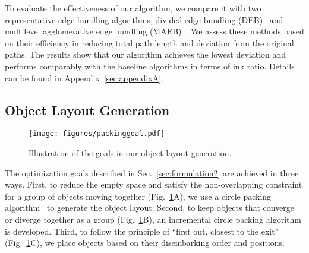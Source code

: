 To evaluate the effectiveness of our algorithm, we compare it with two representative edge bundling algorithms, divided edge bundling (DEB)~\cite{selassie2011divided} and multilevel agglomerative edge bundling (MAEB)~\cite{gansner2011MINGLE}. 
We assess these methods based on their efficiency in reducing total path length and deviation from the original paths.
The results show that our algorithm achieves the lowest deviation and performs comparably with the baseline algorithms in terms of ink ratio.
Details can be found in Appendix~\ref{sec:appendixA}.




\subsection{Object Layout Generation}

\begin{figure}[t]
\setcounter{figure}{5}
  \centering
  \setlength{\abovecaptionskip}{1mm}
  \texttt{[image: figures/packinggoal.pdf]}
  \caption{Illustration of the goals in our object layout generation.}
  \label{fig:packinggoal}
\end{figure}
The optimization goals described in Sec.~\ref{sec:formulation2} are achieved in three ways.
First, to reduce the empty space and satisfy the non-overlapping constraint for a group of objects moving together (Fig.~\ref{fig:packinggoal}A), we use a circle packing algorithm~\cite{yuan2023visual} to generate the object layout.
Second, to keep objects that converge or diverge together as a group (Fig.~\ref{fig:packinggoal}B), an incremental circle packing algorithm is developed.
Third, to follow the principle of ``first out, closest to the exit"(Fig.~\ref{fig:packinggoal}C), we place objects based on their disembarking order and positions. 


